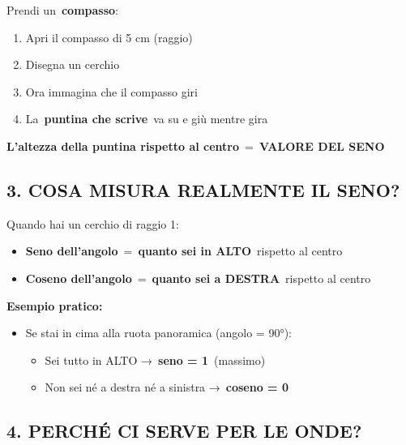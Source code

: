 \documentclass[
]{article}
\providecommand{\tightlist}{%
  \setlength{\itemsep}{0pt}\setlength{\parskip}{0pt}}
\begin{document}
Prendi un~\textbf{compasso}:

\begin{enumerate}
\def\labelenumi{\arabic{enumi}.}
\tightlist
\item
  Apri il compasso di 5 cm (raggio)
\item
  Disegna un cerchio
\item
  Ora immagina che il compasso giri
\item
  La~\textbf{puntina che scrive}~va su e giù mentre gira
\end{enumerate}

\textbf{L'altezza della puntina rispetto al centro}~=~\textbf{VALORE DEL SENO}

\hypertarget{cosa-misura-realmente-il-seno}{%
\subsection{\texorpdfstring{\textbf{3. COSA MISURA REALMENTE IL SENO?}}{3. COSA MISURA REALMENTE IL SENO?}}\label{cosa-misura-realmente-il-seno}}

Quando hai un cerchio di raggio 1:

\begin{itemize}
\tightlist
\item
  \textbf{Seno dell'angolo}~=~\textbf{quanto sei in ALTO}~rispetto al centro
\item
  \textbf{Coseno dell'angolo}~=~\textbf{quanto sei a DESTRA}~rispetto al centro
\end{itemize}

\textbf{Esempio pratico:}

\begin{itemize}
\tightlist
\item
  Se stai in cima alla ruota panoramica (angolo = 90°):

  \begin{itemize}
  \tightlist
  \item
    Sei tutto in ALTO →~\textbf{seno = 1}~(massimo)
  \item
    Non sei né a destra né a sinistra →~\textbf{coseno = 0}
  \end{itemize}
\end{itemize}

\hypertarget{perchuxe9-ci-serve-per-le-onde}{%
\subsection{\texorpdfstring{\textbf{4. PERCHÉ CI SERVE PER LE ONDE?}}{4. PERCHÉ CI SERVE PER LE ONDE?}}\label{perchuxe9-ci-serve-per-le-onde}}
\end{document}
